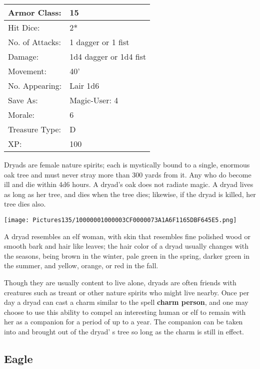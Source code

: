 \documentclass[a4paper,twoside,openany,10pt]{book}
\begin{document}
\begin{multicols}{2}
\begin{tabularx}{0.48\textwidth}{@{}lX@{}}
Armor Class: & 15 \\\hline
Hit Dice: & 2* \\\hline
No. of Attacks: & 1 dagger or 1 fist \\\hline
Damage: & 1d4 dagger or 1d4 fist \\\hline
Movement: & 40' \\\hline
No. Appearing: & Lair 1d6 \\\hline
Save As: & Magic-User: 4 \\\hline
Morale: & 6 \\\hline
Treasure Type: & D \\\hline
XP: & 100 \\\hline
\end{tabularx}\medskip

Dryads are female nature spirits; each is mystically bound to a single, enormous oak tree and must never stray more than 300 yards from it. Any who do become ill and die within 4d6 hours. A dryad's oak does not radiate magic. A dryad lives as long as her tree, and dies when the tree dies; likewise, if the dryad is killed, her tree dies also.

\begin{center}
	\texttt{[image: Pictures135/10000001000003CF0000073A1A6F1165DBF645E5.png]}\medskip
\end{center}


A dryad resembles an elf woman, with skin that resembles fine polished wood or smooth bark and hair like leaves; the hair color of a dryad usually changes with the seasons, being brown in the winter, pale green in the spring, darker green in the summer, and yellow, orange, or red in the fall.

Though they are usually content to live alone, dryads are often friends with creatures such as treant or other nature spirits who might live nearby. Once per day a dryad can cast a charm similar to the spell \textbf{charm person}, and one may choose to use this ability to compel an interesting human or elf to remain with her as a companion for a period of up to a year. The companion can be taken into and brought out of the dryad' s tree so long as the charm is still in effect.\\


\subsection*{Eagle}\label{eagle}


\end{multicols}
\end{document}

